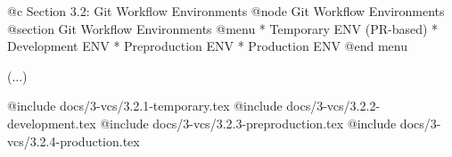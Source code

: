 @c Section 3.2: Git Workflow Environments
@node Git Workflow Environments
@section Git Workflow Environments
@menu
* Temporary ENV (PR-based)
* Development ENV
* Preproduction ENV
* Production ENV
@end menu

(...)

@include docs/3-vcs/3.2.1-temporary.tex
@include docs/3-vcs/3.2.2-development.tex
@include docs/3-vcs/3.2.3-preproduction.tex
@include docs/3-vcs/3.2.4-production.tex
